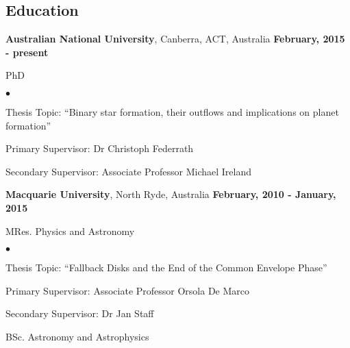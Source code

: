 \documentclass[margin,line]{res}
\newenvironment{list1}{
  \begin{list}{\ding{113}}{%
      \setlength{\itemsep}{0in}
      \setlength{\parsep}{0in} \setlength{\parskip}{0in}
      \setlength{\topsep}{0in} \setlength{\partopsep}{0in} 
      \setlength{\leftmargin}{0.17in}}}{\end{list}}
\newenvironment{list2}{
  \begin{list}{$\bullet$}{%
      \setlength{\itemsep}{0in}
      \setlength{\parsep}{0in} \setlength{\parskip}{0in}
      \setlength{\topsep}{0in} \setlength{\partopsep}{0in} 
      \setlength{\leftmargin}{0.2in}}}{\end{list}}
\begin{document}
\begin{resume}
\section{\sc Education}
{\bf Australian National University}, Canberra, ACT, Australia \hfill {\bf February, 2015 - present}\\
\vspace*{-.1in}
\begin{list1}
\item[] PhD
\begin{list2}
\vspace*{.05in}
\item Thesis Topic:  ``Binary star formation, their outflows and implications on planet formation'' 
\item Primary Supervisor: Dr Christoph Federrath
\item Secondary Supervisor: Associate Professor Michael Ireland
\end{list2}
\vspace*{.05in}
\end{list1}
{\bf Macquarie University}, North Ryde, Australia \hfill {\bf February, 2010 - January, 2015}\\
\vspace*{-.1in}
\begin{list1}
\item[] MRes. Physics and Astronomy
\begin{list2}
\vspace*{.05in}
\item Thesis Topic:  ``Fallback Disks and the End of the Common Envelope Phase'' 
\item Primary Supervisor:  Associate Professor Orsola De Marco
\item Secondary Supervisor: Dr Jan Staff
\end{list2}
\vspace*{.05in}
\item[] BSc. Astronomy and Astrophysics
\end{list1}


\end{resume}
\end{document}
